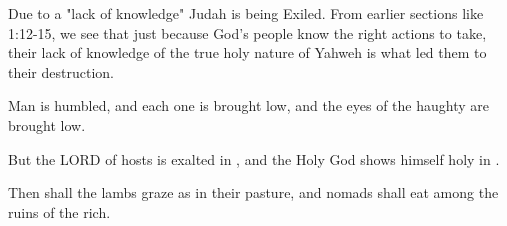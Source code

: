 \documentclass[11pt]{article}
\begin{document}
Due to a "lack of knowledge" Judah is being Exiled. From earlier sections like 1:12-15, we see that just because God's people know the right actions to take, their lack of knowledge of the true holy nature of Yahweh is what led them to their destruction.
\newpage
\begin{biblicaloutline}[Isaiah 5:15-17 (C)]

    \begin{versesection}{2em}
         Man is humbled, and each one is brought low,
        \poetryline and the eyes of the haughty are brought low.
        
         But the LORD of hosts is exalted in ,
        \poetryline and the Holy God shows himself holy in .
        
         Then shall the lambs graze as in their pasture,
        \poetryline and nomads shall eat among the ruins of the rich.
    \end{versesection}

\end{biblicaloutline}
\end{document}

